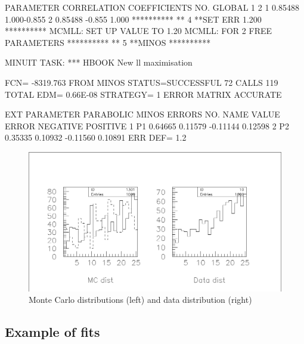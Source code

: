 \begin{Listing}
{ PARAMETER  CORRELATION COEFFICIENTS
       NO.  GLOBAL     1     2
        1  0.85488  1.000-0.855
        2  0.85488 -0.855 1.000
 **********
 **    4 **SET ERR   1.200
 **********
 MCMLL: SET UP VALUE TO  1.20
 MCMLL: FOR  2 FREE PARAMETERS
 **********
 **    5 **MINOS
 **********
 
 MINUIT TASK: *** HBOOK New ll maximisation
 
 FCN=  -8319.763     FROM MINOS     STATUS=SUCCESSFUL    72 CALLS      119 TOTAL
                     EDM=  0.66E-08    STRATEGY= 1      ERROR MATRIX ACCURATE
 
  EXT PARAMETER                  PARABOLIC         MINOS ERRORS
  NO.   NAME        VALUE          ERROR      NEGATIVE      POSITIVE
   1      P1       0.64665       0.11579      -0.11144       0.12598
   2      P2       0.35335       0.10932      -0.11560       0.10891
                               ERR DEF=   1.2
}
\end{Listing}
\finalnewpage%
\begin{figure}
\includegraphics[width=\textwidth]{hmchis.eps}
\caption{Monte Carlo distributions (left) and
         data distribution (right)}
\label{Efield}
\end{figure}
 

\subsection{Example of fits}

